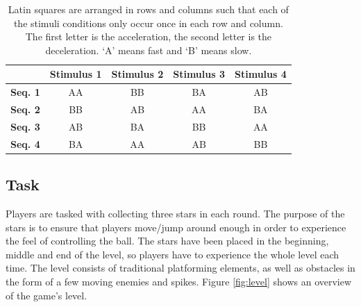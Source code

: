 
\begin{table} \centering
\scriptsize
\caption{Latin squares are arranged in rows and columns such that each of the stimuli conditions only occur once in each row and column. The first letter is the acceleration, the second letter is the deceleration. `A' means fast and `B' means slow.}
\label{table:latin}
\begin{tabular}{ccccc}
\toprule
& \textbf{Stimulus 1} & \textbf{Stimulus 2} & \textbf{Stimulus 3} & \textbf{Stimulus 4}\\
\midrule
\textbf{Seq. 1} & AA & BB & BA & AB\\
\textbf{Seq. 2} & BB & AB & AA & BA\\
\textbf{Seq. 3} & AB & BA & BB & AA\\
\textbf{Seq. 4} & BA & AA & AB & BB\\
\bottomrule
\end{tabular}
\end{table}

\subsection{Task} \label{task}
Players are tasked with collecting three stars in each round. The purpose of the stars is to ensure that players move/jump around enough in order to experience the feel of controlling the ball. The stars have been placed in the beginning, middle and end of the level, so players have to experience the whole level each time. The level consists of traditional platforming elements, as well as obstacles in the form of a few moving enemies and spikes. Figure \ref{fig:level} shows an overview of the game's level.

